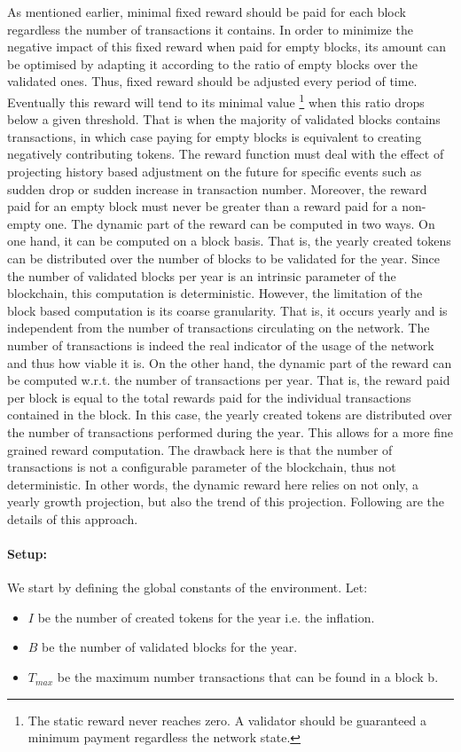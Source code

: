 As mentioned earlier, minimal fixed reward should be paid for each block regardless the number of transactions it contains. In order to minimize the negative impact of this fixed reward when paid for empty blocks, its amount can be optimised by adapting it according to the ratio of empty blocks over the validated ones. Thus, fixed reward should be adjusted every period of time. Eventually this reward will tend to its minimal value \footnote{The static reward never reaches zero. A validator should be guaranteed a minimum payment regardless  the network state.} when this ratio drops below a given threshold. That is when the majority of validated blocks contains transactions, in which case paying for empty blocks is equivalent to creating negatively contributing tokens. The reward function must deal with the effect of projecting history based adjustment on the future for specific events such as sudden drop or sudden increase in transaction number. Moreover, the reward paid for an empty block must never be greater than a reward paid for a non-empty one. The dynamic part of the reward can be computed in two ways. On one hand, it can be computed on a block basis. That is, the yearly created tokens can be distributed over the number of blocks to be validated for the year. Since the number of validated blocks per year is an intrinsic parameter of the blockchain, this computation is deterministic. However, the limitation of the block based computation is its coarse granularity. That is, it occurs yearly and is independent from the number of transactions circulating on the network. The number of transactions is indeed the real indicator of the usage of the network and thus how viable it is. On the other hand, the dynamic part of the reward can be computed w.r.t. the number of transactions per year. That is, the reward paid per block is equal to the total rewards paid for the individual transactions contained in the block. In this case, the yearly created tokens are distributed over the number of transactions performed during the year. This allows for a more fine grained reward computation. The drawback here is that the number of transactions is not a configurable parameter of the blockchain, thus not deterministic. In other words, the dynamic reward here relies on not only, a yearly growth projection, but also the trend of this projection. Following are the details of this approach.  
\paragraph{Setup:} 
We start by defining the global constants of the environment. Let: 
\begin{itemize}
	\item $I$ be the number of created tokens for the year i.e. the inflation.
	\item $B$ be the number of validated blocks for the year.
	\item $T_{max}$ be the maximum number transactions that can be found in a block b.
\end{itemize}

